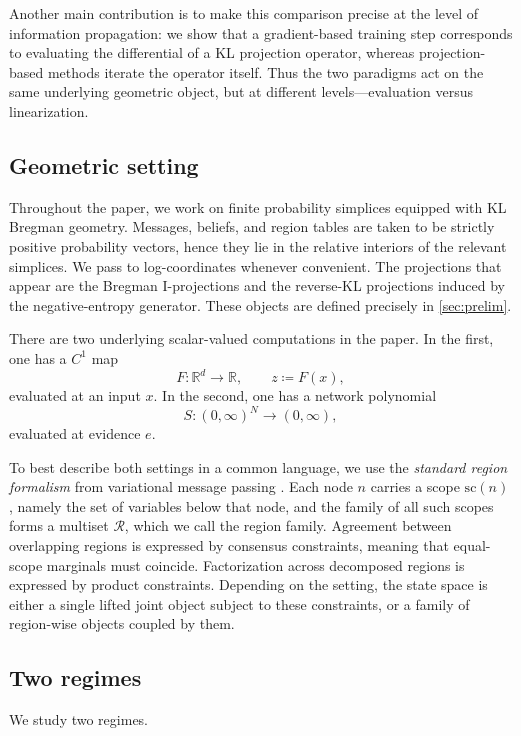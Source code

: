 \documentclass[12pt]{article}
\newcommand{\1}{\mathbb{1}}
\theoremstyle{definition}
\begin{document}
Another main contribution is to make this comparison precise at the level
of information propagation: we show that a gradient-based training step
corresponds to evaluating the differential of a KL projection
operator, whereas projection-based methods iterate the operator
itself. Thus the two paradigms act on the same underlying geometric
object, but at different levels---evaluation versus linearization.
\subsection{Geometric setting}
\label{subsec:geometric-setting}

Throughout the paper, we work on finite probability simplices equipped
with KL Bregman geometry.
Messages, beliefs, and region tables are taken to be strictly positive
probability vectors, hence they lie in the relative interiors of the
relevant simplices.
We pass to log-coordinates whenever convenient.
The projections that appear are the Bregman I-projections and the
reverse-KL projections induced by the negative-entropy generator.
These objects are defined precisely in \cref{sec:prelim}.

There are two underlying scalar-valued computations in the paper.
In the first, one has a $C^1$ map
\[
F:\mathbb{R}^d\to\mathbb{R},
\qquad
z \coloneqq F(x),
\]
evaluated at an input $x$.
In the second, one has a network polynomial
\[
S:(0,\infty)^N\to(0,\infty),
\]
evaluated at evidence $e$.

To best describe both settings in a common language, we use the \emph{standard
region formalism} from variational message passing
\cite{yedidia2005constructing}.
Each node $n$ carries a scope $\mathrm{sc}(n)$, namely the set of
variables below that node, and the family of all such scopes forms a
multiset $\mathcal R$, which we call the region family.
Agreement between overlapping regions is expressed by consensus
constraints, meaning that equal-scope marginals must coincide.
Factorization across decomposed regions is expressed by product
constraints.
Depending on the setting, the state space is either a single lifted
joint object subject to these constraints, or a family of region-wise
objects coupled by them.

\subsection{Two regimes}
\label{subsec:regimes}

We study two regimes.
\end{document}
